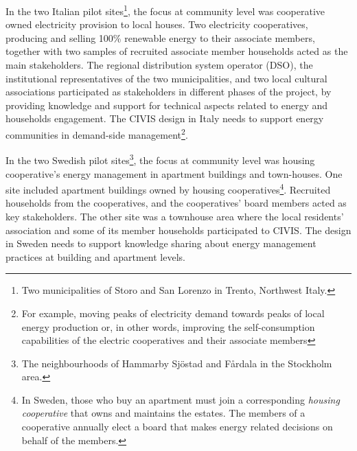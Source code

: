 In the two Italian pilot sites\footnote{Two municipalities of Storo and San Lorenzo in Trento, Northwest Italy.}, the focus at community level was cooperative owned electricity provision to local houses. 
Two electricity cooperatives, producing and 
selling 100\% renewable energy to their associate members, together with two samples of recruited 
associate member households acted as the main stakeholders.
The regional distribution system 
operator (DSO), the institutional representatives of the two municipalities, and two local cultural 
associations participated as stakeholders in different phases of the project, by providing knowledge 
and support for technical aspects related to energy and households engagement.
The CIVIS design in Italy needs to support energy communities in demand-side management\footnote{For example, moving peaks of electricity demand towards peaks of local energy
production or, in other words, improving the self-consumption capabilities of the electric cooperatives and
their associate members}. 

In the two Swedish pilot sites\footnote{The neighbourhoods of Hammarby Sj\"{o}stad and F\aa{}rdala in the Stockholm area.}, the focus at community level was housing cooperative's energy management in apartment buildings and town-houses.  
One site included apartment buildings owned by housing 
cooperatives\footnote{In Sweden, those who buy an apartment must join a corresponding \textit{housing cooperative} that owns and maintains the estates. The 
members of a cooperative annually elect a board that makes energy related decisions on behalf of 
the members.}. Recruited households from the cooperatives, and the cooperatives' board members acted
as key stakeholders. %
The other site was a townhouse area where the 
local residents' association and some of its member households participated to CIVIS.
The design in Sweden needs to support knowledge sharing about energy management practices at building and apartment levels.


